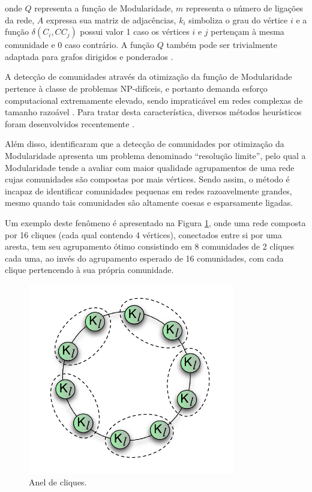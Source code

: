 \noindent onde $Q$ representa a função de Modularidade, $m$ representa o número de ligações da rede, $A$ expressa sua matriz de adjacências, $k_i$ simboliza o grau do vértice $i$ e a função $\delta(C_i, CC_j)$ possui valor 1 caso os vértices $i$ e $j$ pertençam à mesma comunidade e 0 caso contrário. A função $Q$ também pode ser trivialmente adaptada para grafos dirigidos e ponderados \cite{Fortunato2010}.

A detecção de comunidades através da otimização da função de Modularidade pertence à classe de problemas NP-difíceis, e portanto demanda esforço computacional extremamente elevado, sendo impraticável em redes complexas de tamanho razoável \cite{Brandes2008}. Para tratar desta característica, diversos métodos heurísticos foram desenvolvidos recentemente \cite{Blondel2008,Santiago2017,Nascimento2013,Agarwal2008,Pizzuti2008}.

Além disso,  identificaram que a detecção de comunidades por otimização da Modularidade apresenta um problema denominado ``resolução limite'', pelo qual a Modularidade tende a avaliar com maior qualidade agrupamentos de uma rede cujas comunidades são compostas por mais vértices. Sendo assim, o método é incapaz de identificar comunidades pequenas em redes razoavelmente grandes, mesmo quando tais comunidades são altamente coesas e esparsamente ligadas.

Um exemplo deste fenômeno é apresentado na Figura \ref{fig:ringofcliques}, onde uma rede composta por 16 cliques (cada qual contendo 4 vértices), conectados entre si por uma aresta, tem seu agrupamento ótimo consistindo em 8 comunidades de 2 cliques cada uma, ao invés do agrupamento esperado de 16 comunidades, com cada clique pertencendo à sua própria comunidade.

\begin{figure}[ht]
    \centering
    \includegraphics[width=9cm]{imagens/ring_of_cliques.png}
    \caption{Anel de cliques.}
    \label{fig:ringofcliques}
\end{figure}

